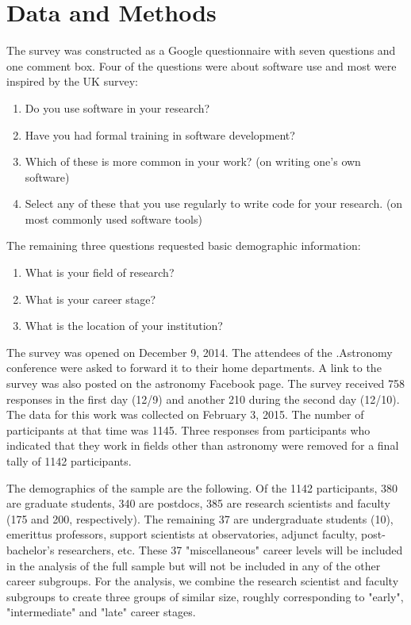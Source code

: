 \section{Data and Methods}

The survey was constructed as a Google questionnaire with seven questions and one comment box. Four of the questions were about software use and most were inspired by the UK survey:
\begin{enumerate}
\item Do you use software in your research?
\item Have you had formal training in software development?
\item Which of these is more common in your work? (on writing one's own software)
\item Select any of these that you use regularly to write code for your research. (on most commonly used software tools)
\end{enumerate}
The remaining three questions requested basic demographic information:
\begin{enumerate}
\item What is your field of research?
\item What is your career stage?
\item What is the location of your institution?
\end{enumerate}

The survey was opened on December 9, 2014. The attendees of the .Astronomy conference were asked to forward it to their home departments. A link to the survey was also posted on the astronomy Facebook page. The survey received 758 responses in the first day (12/9) and another 210 during the second day (12/10). The data for this work was collected on February 3, 2015. The number of participants at that time was 1145. Three responses from participants who indicated that they work in fields other than astronomy were removed for a final tally of 1142 participants. 

The demographics of the sample are the following. Of the 1142 participants, 380 are graduate students, 340 are postdocs, 385 are research scientists and faculty (175 and 200, respectively). The remaining 37 are undergraduate students (10), emerittus professors, support scientists at observatories, adjunct faculty, post-bachelor's researchers, etc. These 37 "miscellaneous" career levels will be included in the analysis of the full sample but will not be included in any of the other career subgroups. For the analysis, we combine the research scientist and faculty subgroups to create three groups of similar size, roughly corresponding to "early", "intermediate" and "late" career stages.


